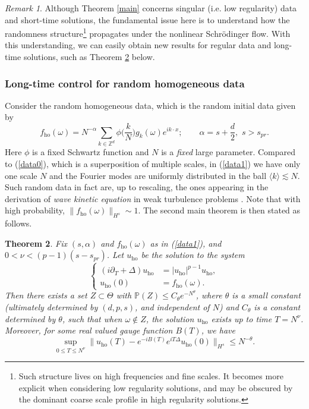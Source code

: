 \documentclass[11 pt,reqno]{amsart}
\newtheorem{thm}{Theorem}[section]
\theoremstyle{definition}
\theoremstyle{remark}
\newtheorem{rem}[thm]{Remark}
\numberwithin{equation}{section}
\newcommand{\Zb}{\mathbb{Z}}
\newcommand{\Pb}{\mathbb{P}}
\begin{document}
\begin{rem} Although Theorem \ref{main} concerns singular (i.e. low regularity) data and short-time solutions, the fundamental issue here is to understand how the randomness structure\footnote{Such structure lives on high frequencies and fine scales. It becomes more explicit when considering low regularity solutions, and may be obscured by the dominant coarse scale profile in high regularity solutions.} propagates under the nonlinear Schr\"{o}dinger flow. With this understanding, we can easily obtain new results for regular data and long-time solutions, such as Theorem \ref{main2} below.
 \end{rem}
 \subsubsection{Long-time control for random homogeneous data} Consider the random homogeneous data, which is the random initial data given by
 \begin{equation}\label{data1}f_{\mathrm{ho}}(\omega)=N^{-\alpha}\sum_{k\in\Zb^d}\phi\big(\frac{k}{N}\big)g_k(\omega)e^{ik\cdot x};\qquad \alpha=s+\frac{d}{2},\,\,s>s_{pr}.
 \end{equation} Here $\phi$ is a fixed Schwartz function and $N$ is a \emph{fixed} large parameter. Compared to (\ref{data0}), which is a superposition of multiple scales, in (\ref{data1}) we have only one scale $N$ and the Fourier modes are uniformly distributed in the ball $\langle k\rangle\lesssim N$. Such random data in fact are, up to rescaling, the ones appearing in the derivation of \emph{wave kinetic equation} in weak turbulence problems \cite{BGHS,CG,DH}. Note that with high probability, $\|f_{\mathrm{ho}}(\omega)\|_{H^{s}}\sim 1$. The second main theorem is then stated as follows.
\begin{thm}\label{main2} Fix $(s,\alpha)$ and $f_{\mathrm{ho}}(\omega)$ as in (\ref{data1}), and $0<\nu<(p-1)(s-s_{pr})$. Let $u_{\mathrm{ho}}$ be the solution to the system \begin{equation}\label{nlstrunc2}
\left\{
\begin{aligned}(i\partial_T+\Delta)u_{\mathrm{ho}}&=|u_{\mathrm{ho}}|^{p-1}u_{\mathrm{ho}},\\
u_{\mathrm{ho}}(0)&=f_{\mathrm{ho}}(\omega).
\end{aligned}
\right.
\end{equation} Then there exists a set $Z\subset\Theta$ with $\Pb(Z)\leq C_\theta e^{-N^\theta}$, where $\theta$ is a small constant (ultimately determined by $(d,p,s)$, and independent of $N$) and $C_\theta$ is a constant determined by $\theta$, such that when $\omega\not\in Z$, the solution $u_{\mathrm{ho}}$ exists up to time $T=N^\nu$. Moreover, for some real valued gauge function $B(T)$, we have
\begin{equation}\label{longtimecon}\sup_{0\leq T\leq N^\nu}\|u_{\mathrm{ho}}(T)-e^{-iB(T)}e^{iT\Delta}u_{\mathrm{ho}}(0)\|_{H^s}\leq N^{-\theta}.
\end{equation}
\end{thm}
\end{document}
